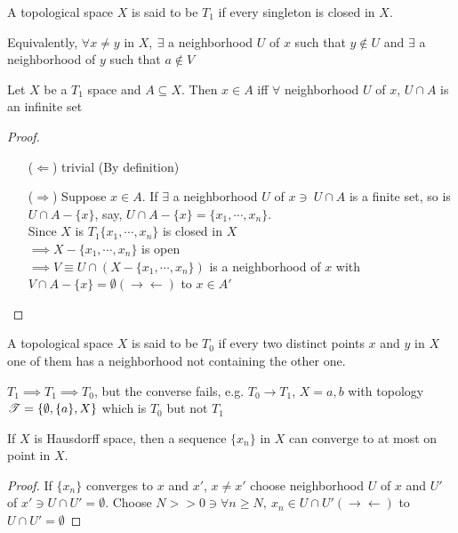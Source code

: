 \begin{defn}
	A topological space $X$ is said to be $T_1$ if every singleton is closed in $X$.
	
	Equivalently, $\forall x \neq y$ in $X,~ \exists$ a neighborhood $U$ of $x$ such that $y \notin U$ and $\exists$ a neighborhood of $y$ such that $a \notin V$
\end{defn}

\begin{thm*}
	Let $X$ be a $T_1$ space and $A \subseteq X$. Then $x \in A$ iff $\forall$ neighborhood $U$ of $x$, $U \cap A$ is an infinite set
\end{thm*}

\begin{proof}$ $
	\begin{enumerate}
		\item[($\Leftarrow$)] trivial (By definition)
		\item[($\Rightarrow$)] Suppose $x \in A$. If $\exists$ a neighborhood $U$ of $x \ni ~ U\cap A$ is a finite set, so is $U \cap A - \{x\}$, say, $U \cap A - \{x\} = \{x_1,\cdots,x_n\}$.\\
		Since $X$ is $T_1 \{x_1,\cdots,x_n\}$ is closed in $X$\\
		$\implies X - \{x_1,\cdots,x_n\}$ is open\\
		$\implies V \equiv U \cap (X - \{x_1,\cdots,x_n\})$ is a neighborhood of $x$ with $V \cap A - \{x\} = \emptyset (\rightarrow\leftarrow)$ to $x \in A'$
	\end{enumerate}
\end{proof}

\begin{defn}
	A topological space $X$ is said to be $T_0$ if every two distinct points $x$ and $y$ in $X$ one of them has a neighborhood not containing the other one.
\end{defn}

\begin{rmk*}
	$T_1 \implies T_1 \implies T_0$, but the converse fails, e.g. $T_0 \rightarrow T_1$, $X = a,b$ with topology $\mathscr{T} = \{\emptyset,\{a\},X\}$ which is $T_0$ but not $T_1$
\end{rmk*}

\begin{thm*}
	If $X$ is Hausdorff space, then a sequence $\{x_n\}$ in $X$ can converge to at most on point in $X$.
\end{thm*}

\begin{proof}
	If $\{x_n\}$ converges to $x$ and $x'$, $x \neq x'$ choose neighborhood $U$ of $x$ and $U'$ of $x' \ni U \cap U' = \emptyset$. Choose $N >> 0 \ni \forall n \geq N,~x_n \in U \cap U' (\rightarrow \leftarrow)$ to $U \cap U' = \emptyset$
\end{proof}

